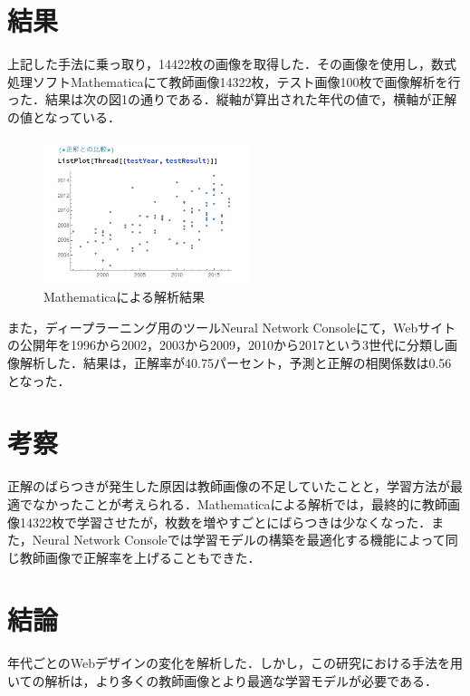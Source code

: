 \documentclass[uplatex,twocolumn,dvipdfmx]{jsarticle}
\begin{document}
\section{結果}

上記した手法に乗っ取り，14422枚の画像を取得した．その画像を使用し，数式処理ソフトMathematicaにて教師画像14322枚，テスト画像100枚で画像解析を行った．結果は次の図1の通りである．縦軸が算出された年代の値で，横軸が正解の値となっている．\vspace{0.2in} \\


\vspace{-1zh}
\begin{figure}[htb]
\centering
\includegraphics[width=6cm,clip]{graph.PNG}
\caption{Mathematicaによる解析結果}
\end{figure}
\vspace{-1zh}


また，ディープラーニング用のツールNeural Network Consoleにて，Webサイトの公開年を1996から2002，2003から2009，2010から2017という3世代に分類し画像解析した．結果は，正解率が40.75パーセント，予測と正解の相関係数は0.56となった．

\section{考察}

正解のばらつきが発生した原因は教師画像の不足していたことと，学習方法が最適でなかったことが考えられる．Mathematicaによる解析では，最終的に教師画像14322枚で学習させたが，枚数を増やすごとにばらつきは少なくなった．また，Neural Network Consoleでは学習モデルの構築を最適化する機能によって同じ教師画像で正解率を上げることもできた．

\section{結論}

年代ごとのWebデザインの変化を解析した．しかし，この研究における手法を用いての解析は，より多くの教師画像とより最適な学習モデルが必要である．


\end{document}
